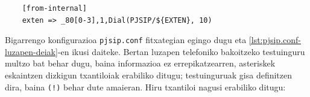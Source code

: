 \begin{listing}
    \begin{verbatim}
    [from-internal]
    exten => _80[0-3],1,Dial(PJSIP/${EXTEN}, 10)
    \end{verbatim}
    \caption{Luzapen telefonikoen konfigurazioa deientzako extensions.conf konfigurazio fitxategian}
    \label{lst:extensions.conf-luzapen-deiak}
\end{listing}

Bigarrengo konfigurazioa \texttt{pjsip.conf} fitxategian egingo dugu eta \autoref{lst:pjsip.conf-luzapen-deiak}-en ikusi daiteke. Bertan luzapen telefoniko bakoitzeko testuinguru multzo bat behar dugu, baina informazioa ez errepikatzearren, asteriskek eskaintzen dizkigun txantiloiak erabiliko ditugu; testuinguruak gisa definitzen dira, baina \texttt{(!)} behar dute amaieran. Hiru txantiloi nagusi erabiliko ditugu:
